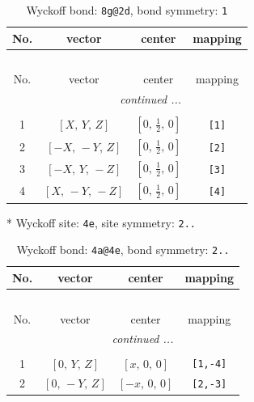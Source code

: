 \documentclass[fleqn,8pt]{jsarticle}
\begin{document}
\begin{longtable}{cccc}
\caption{Wyckoff bond: {\tt 8g@2d}, bond symmetry: {\tt 1}}
 \\
 \hline \hline
No. & vector & center & mapping \\ \hline \endfirsthead

\multicolumn{3}{l}{\tablename\ \thetable{}} \\
 \hline \hline
No. & vector & center & mapping \\ \hline \endhead

 \hline \hline
\multicolumn{3}{r}{\footnotesize\it continued ...} \\ \endfoot

 \hline \hline
\multicolumn{3}{r}{} \\ \endlastfoot

1 & $\left[ X,\, Y,\, Z \right]$ & $\left[ 0,\, \frac{1}{2},\, 0 \right]$ & {\tt [1]} \\ \hline
2 & $\left[ - X,\, - Y,\, Z \right]$ & $\left[ 0,\, \frac{1}{2},\, 0 \right]$ & {\tt [2]} \\ \hline
3 & $\left[ - X,\, Y,\, - Z \right]$ & $\left[ 0,\, \frac{1}{2},\, 0 \right]$ & {\tt [3]} \\ \hline
4 & $\left[ X,\, - Y,\, - Z \right]$ & $\left[ 0,\, \frac{1}{2},\, 0 \right]$ & {\tt [4]} \\
\end{longtable}
* Wyckoff site: {\tt 4e}, site symmetry: {\tt 2..}
\renewcommand{\arraystretch}{1.2}
\begin{longtable}{cccc}
\caption{Wyckoff bond: {\tt 4a@4e}, bond symmetry: {\tt 2..}}
 \\
 \hline \hline
No. & vector & center & mapping \\ \hline \endfirsthead

\multicolumn{3}{l}{\tablename\ \thetable{}} \\
 \hline \hline
No. & vector & center & mapping \\ \hline \endhead

 \hline \hline
\multicolumn{3}{r}{\footnotesize\it continued ...} \\ \endfoot

 \hline \hline
\multicolumn{3}{r}{} \\ \endlastfoot

1 & $\left[ 0,\, Y,\, Z \right]$ & $\left[ x,\, 0,\, 0 \right]$ & {\tt [1,-4]} \\ \hline
2 & $\left[ 0,\, - Y,\, Z \right]$ & $\left[ - x,\, 0,\, 0 \right]$ & {\tt [2,-3]} \\
\end{longtable}
\end{document}
